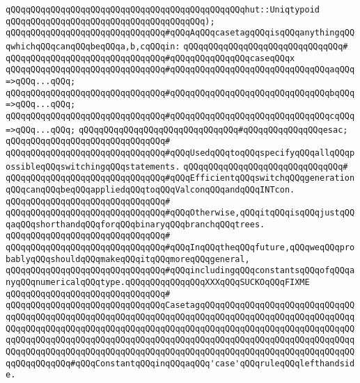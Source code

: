 \verb|qQQqqQQqqQQqqQQqqQQqqQQqqQQqqQQqqQQqqQQqqQQqqQQqhut::Uniqtypoid|\newline
\verb|qQQqqQQqqQQqqQQqqQQqqQQqqQQqqQQqqQQqqQQq);|\newline
\newline
\verb|qQQqqQQqqQQqqQQqqQQqqQQqqQQqqQQq#qQQqAqQQqcasetagqQQqisqQQqanythingqQQqwhichqQQqcanqQQqbeqQQqa,b,cqQQqin:|\newline
\verb|qQQqqQQqqQQqqQQqqQQqqQQqqQQqqQQq#|\newline
\verb|qQQqqQQqqQQqqQQqqQQqqQQqqQQqqQQq#qQQqqQQqqQQqqQQqcaseqQQqx|\newline
\verb|qQQqqQQqqQQqqQQqqQQqqQQqqQQqqQQq#qQQqqQQqqQQqqQQqqQQqqQQqqQQqqQQqaqQQq=>qQQq...qQQq;|\newline
\verb|qQQqqQQqqQQqqQQqqQQqqQQqqQQqqQQq#qQQqqQQqqQQqqQQqqQQqqQQqqQQqqQQqbqQQq=>qQQq...qQQq;|\newline
\verb|qQQqqQQqqQQqqQQqqQQqqQQqqQQqqQQq#qQQqqQQqqQQqqQQqqQQqqQQqqQQqqQQqcqQQq=>qQQq...qQQq;|\newline
\verb|qQQqqQQqqQQqqQQqqQQqqQQqqQQqqQQq#qQQqqQQqqQQqqQQqesac;|\newline
\verb|qQQqqQQqqQQqqQQqqQQqqQQqqQQqqQQq#|\newline
\verb|qQQqqQQqqQQqqQQqqQQqqQQqqQQqqQQq#qQQqUsedqQQqtoqQQqspecifyqQQqallqQQqpossibleqQQqswitchingqQQqstatements.|\newline
\verb|qQQqqQQqqQQqqQQqqQQqqQQqqQQqqQQq#|\newline
\verb|qQQqqQQqqQQqqQQqqQQqqQQqqQQqqQQq#qQQqEfficientqQQqswitchqQQqgenerationqQQqcanqQQqbeqQQqappliedqQQqtoqQQqValconqQQqandqQQqINTcon.|\newline
\verb|qQQqqQQqqQQqqQQqqQQqqQQqqQQqqQQq#|\newline
\verb|qQQqqQQqqQQqqQQqqQQqqQQqqQQqqQQq#qQQqOtherwise,qQQqitqQQqisqQQqjustqQQqaqQQqshorthandqQQqforqQQqbinaryqQQqbranchqQQqtrees.|\newline
\verb|qQQqqQQqqQQqqQQqqQQqqQQqqQQqqQQq#|\newline
\verb|qQQqqQQqqQQqqQQqqQQqqQQqqQQqqQQq#qQQqInqQQqtheqQQqfuture,qQQqweqQQqprobablyqQQqshouldqQQqmakeqQQqitqQQqmoreqQQqgeneral,|\newline
\verb|qQQqqQQqqQQqqQQqqQQqqQQqqQQqqQQq#qQQqincludingqQQqconstantsqQQqofqQQqanyqQQqnumericalqQQqtype.qQQqqQQqqQQqqQQqXXXqQQqSUCKOqQQqFIXME|\newline
\verb|qQQqqQQqqQQqqQQqqQQqqQQqqQQqqQQq#|\newline
\verb|qQQqqQQqqQQqqQQqqQQqqQQqqQQqqQQqCasetagqQQqqQQqqQQqqQQqqQQqqQQqqQQqqQQqqQQqqQQqqQQqqQQqqQQqqQQqqQQqqQQqqQQqqQQqqQQqqQQqqQQqqQQqqQQqqQQqqQQqqQQqqQQqqQQqqQQqqQQqqQQqqQQqqQQqqQQqqQQqqQQqqQQqqQQqqQQqqQQqqQQqqQQqqQQqqQQqqQQqqQQqqQQqqQQqqQQqqQQqqQQqqQQqqQQqqQQqqQQqqQQqqQQqqQQqqQQqqQQqqQQqqQQqqQQqqQQqqQQqqQQqqQQqqQQqqQQqqQQqqQQqqQQqqQQqqQQqqQQqqQQqqQQqqQQqqQQqqQQqqQQq#qQQqConstantqQQqinqQQqaqQQq'case'qQQqruleqQQqlefthandside.|\newline
